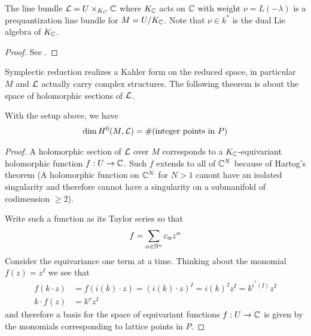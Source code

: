 \begin{remark}
\end{remark}

\begin{proposition}
    The line bundle ${\mathcal{L}} = U \times_{K_C} \mathbb{C}$ where $K_{\mathbb{C}}$ acts on $\mathbb{C}$ with 
    weight $\nu = L(-\lambda)$ is a prequantization line bundle for $M = U/K_{\mathbb{C}}$. Note that $\nu \in k^*$ is the 
    dual Lie algebra of $K_{\mathbb{C}}$.
\end{proposition}
\begin{proof}
    See \cite{hamilton}.
\end{proof}
Symplectic reduction realizes a Kahler form on the reduced space, in particular
$M$ and ${\mathcal{L}}$ actually carry complex structures. The following theorem is about the space of
holomorphic sections of ${\mathcal{L}}$.
\begin{theorem}
    With the setup above, we have \begin{align*}
        \dim H^0(M,{\mathcal{L}}) = \#(\text{integer points in } P)
    \end{align*}
\end{theorem}

\begin{proof}
    A holomorphic section of ${\mathcal{L}}$ over $M$ corresponds to a $K_{\mathbb{C}}$-equivariant holomorphic function $f:U\to \mathbb{C}$. 
    Such $f$ extends to all of $\mathbb{C}^N$ because of Hartog's theorem (A holomorphic function on $\mathbb{C}^N$ for $N>1$ canont have 
    an isolated singularity and therefore cannot have a singularity on a submanifold of codimension $\geq 2$).

    \hfill

    Write such a function as its Taylor series so that \begin{align*}
        f = \sum_{\alpha\in\mathbb{N}^n} c_\alpha z^\alpha
    \end{align*} Consider the equivariance one term at a time. 
    Thinking about the monomial $f(z) = z^I$ we 
    see that \begin{align*}
        f(k\cdot z) &= f(i(k)\cdot z) = (i(k)\cdot z)^I = i(k)^Iz^I = k^{i^*(I)}z^I \\
        k\cdot f(z) &= k^{\nu}z^I
    \end{align*} and therefore a basis for the space of equivariant functions $f:U\to \mathbb{C}$ 
    is given by the monomials corresponding to lattice points in $P$.
\end{proof}


